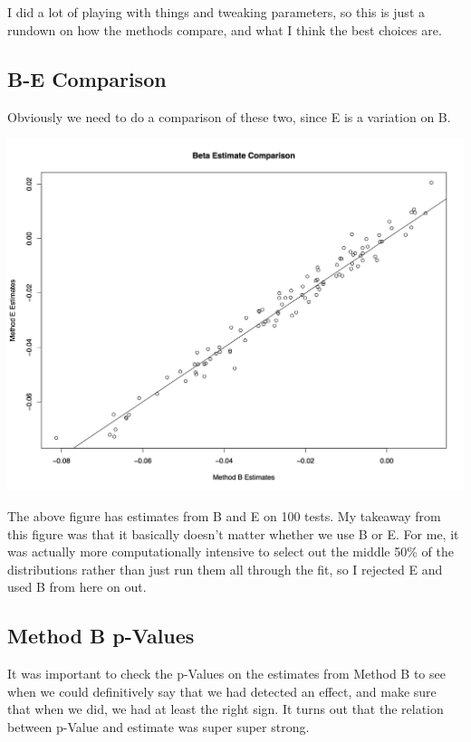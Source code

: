 \documentclass[11pt]{article} %
\begin{document}
\section{}
I did a lot of playing with things and tweaking parameters, so this is just a rundown on how the methods compare, and what I think the best choices are.

\subsection{B-E Comparison}
Obviously we need to do a comparison of these two, since E is a variation on B.

\includegraphics[scale=0.5]{BE Comparison.png}

The above figure has estimates from B and E on 100 tests. My takeaway from this figure was that it basically doesn't matter whether we use B or E. For me, it was actually more computationally intensive to select out the middle 50\% of the distributions rather than just run them all through the fit, so I rejected E and used B from here on out.

\subsection{Method B p-Values}

It was important to check the p-Values on the estimates from Method B to see when we could definitively say that we had detected an effect, and make sure that when we did, we had at least the right sign. It turns out that the relation between p-Value and estimate was super super strong.
\end{document}
